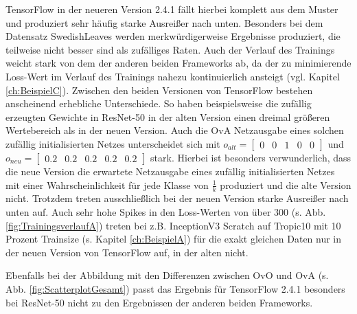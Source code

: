 TensorFlow \cite{tensorflow} in der neueren Version 2.4.1 fällt hierbei komplett aus dem Muster und produziert sehr häufig starke Ausreißer nach unten. Besonders bei dem Datensatz SwedishLeaves \cite{swedishLeaves} werden merkwürdigerweise Ergebnisse produziert, die teilweise nicht besser sind als zufälliges Raten. Auch der Verlauf des Trainings weicht stark von dem der anderen beiden Frameworks ab, da der zu minimierende Loss-Wert im Verlauf des Trainings nahezu kontinuierlich ansteigt (vgl. Kapitel \ref{ch:BeispielC}).
Zwischen den beiden Versionen von TensorFlow \cite{tensorflow} bestehen anscheinend erhebliche Unterschiede. So haben beispielsweise die zufällig erzeugten Gewichte in ResNet-50 in der alten Version einen dreimal größeren Wertebereich als in der neuen Version. Auch die OvA Netzausgabe eines solchen zufällig initialisierten Netzes unterscheidet sich mit $o_{alt}=\begin{bmatrix}
0 & 0 & 1 & 0 & 0
\end{bmatrix}$ und $o_{neu}=\begin{bmatrix}
0.2 & 0.2 & 0.2 & 0.2 & 0.2
\end{bmatrix}$ stark. Hierbei ist besonders verwunderlich, dass die neue Version die erwartete Netzausgabe eines zufällig initialisierten Netzes mit einer Wahrscheinlichkeit für jede Klasse von $\frac{1}{k}$ produziert und die alte Version nicht. Trotzdem treten ausschließlich bei der neuen Version starke Ausreißer nach unten auf. Auch sehr hohe Spikes in den Loss-Werten von über 300 (s. Abb. \ref{fig:TrainingsverlaufA}) treten bei z.B. InceptionV3 Scratch auf Tropic10 mit 10 Prozent Trainsize (s. Kapitel \ref{ch:BeispielA}) für die exakt gleichen Daten nur in der neuen Version von TensorFlow \cite{tensorflow} auf, in der alten nicht.


Ebenfalls bei der Abbildung mit den Differenzen zwischen OvO und OvA (s. Abb. \ref{fig:ScatterplotGesamt}) passt das Ergebnis für TensorFlow 2.4.1 \cite{tensorflow} besonders bei ResNet-50 nicht zu den Ergebnissen der anderen beiden Frameworks.\\


